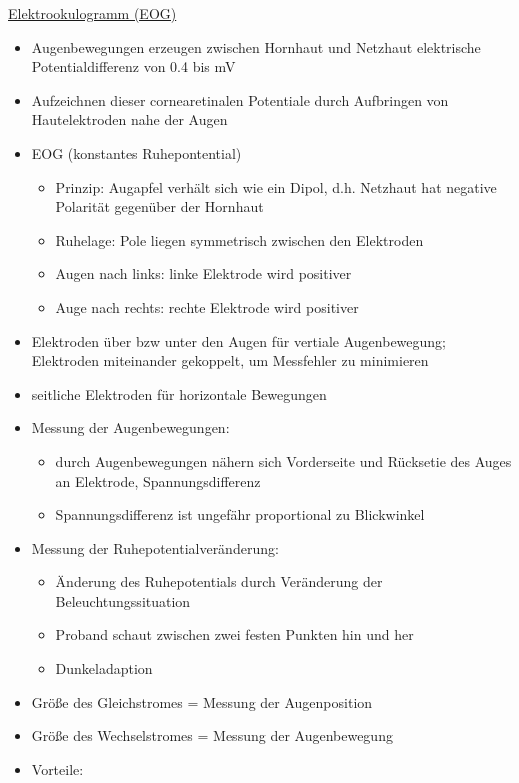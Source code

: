 \documentclass[a4paper,10pt,oneside]{article}
\begin{document}
\underline{Elektrookulogramm (EOG)} \\
	\begin{itemize}
		\item Augenbewegungen erzeugen zwischen Hornhaut und Netzhaut elektrische Potentialdifferenz von 0.4 bis mV
		\item Aufzeichnen dieser cornearetinalen Potentiale durch Aufbringen von Hautelektroden nahe der Augen
		\item EOG (konstantes Ruhepontential)
			\begin{itemize}
				\item Prinzip: Augapfel verhält sich wie ein Dipol, d.h. Netzhaut hat negative Polarität gegenüber der Hornhaut 
				\item Ruhelage: Pole liegen symmetrisch zwischen den Elektroden
				\item Augen nach links: linke Elektrode wird positiver
				\item Auge nach rechts: rechte Elektrode wird positiver
			\end{itemize}
		\item Elektroden über bzw unter den Augen für vertiale Augenbewegung; Elektroden miteinander gekoppelt, um Messfehler zu minimieren
		\item seitliche Elektroden für horizontale Bewegungen
		\item Messung der Augenbewegungen:
			\begin{itemize}
				\item durch Augenbewegungen nähern sich Vorderseite und Rücksetie des Auges an Elektrode, Spannungsdifferenz
				\item Spannungsdifferenz ist ungefähr proportional zu Blickwinkel
			\end{itemize}
		\item Messung der Ruhepotentialveränderung:
			\begin{itemize}
				\item Änderung des Ruhepotentials durch Veränderung der Beleuchtungssituation
				\item Proband schaut zwischen zwei festen Punkten hin und her
				\item Dunkeladaption
			\end{itemize}
		\item Größe des Gleichstromes = Messung der Augenposition
		\item Größe des Wechselstromes = Messung der Augenbewegung 
		\item Vorteile:
			\begin{itemize}

\end{itemize}
\end{itemize}
\end{document}
